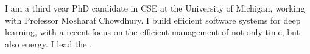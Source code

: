 

\begin{cvparagraph}

I am a third year PhD candidate in CSE at the University of Michigan, working with Professor Mosharaf Chowdhury.
I build efficient software systems for deep learning, with a recent focus on the efficient management of not only time, but also energy.
I lead the \href{https://ml.energy}{}.
\end{cvparagraph}
